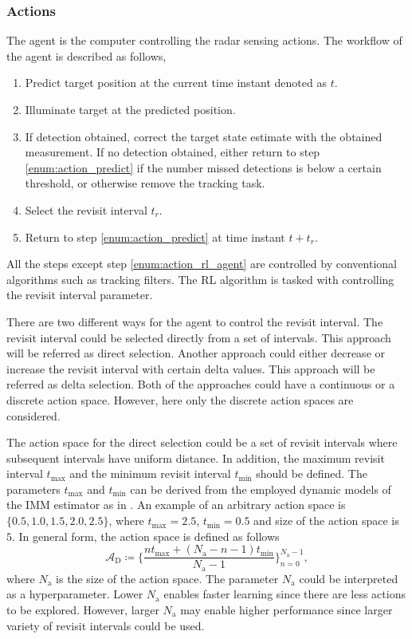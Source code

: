\documentclass[english, 12pt, a4paper, elec, utf8, a-1b, online]{aaltothesis}
\newcommand{\As}{\mathcal{A}}
\newcommand{\tmax}{t_\text{max}}
\newcommand{\tmin}{t_\text{min}}
\newcommand{\Asdir}{\As_\text{D}}
\newcommand{\nacts}{{N_\text{a}}}
\begin{document}
\subsubsection{Actions} \label{sec:actions}

The agent is the computer controlling the radar sensing actions.
The workflow of the agent is described as follows,
\begin{enumerate}
    \item Predict target position at the current time instant denoted as $t$. \label{enum:action_predict}
    \item Illuminate target at the predicted position.
    \item If detection obtained, correct the target state estimate with the obtained measurement. If no detection obtained, either return to step \ref{enum:action_predict} if the number missed detections is below a certain threshold, or otherwise remove the tracking task.
    \item Select the revisit interval $t_r$. \label{enum:action_rl_agent}
    \item Return to step \ref{enum:action_predict} at time instant $t+t_r$.
\end{enumerate}
All the steps except step \ref{enum:action_rl_agent} are controlled by conventional algorithms such as tracking filters.
The RL algorithm is tasked with controlling the revisit interval parameter.

There are two different ways for the agent to control the revisit interval.
The revisit interval could be selected directly from a set of intervals.
This approach will be referred as direct selection.
Another approach could either decrease or increase the revisit interval with certain delta values.
This approach will be referred as delta selection.
Both of the approaches could have a continuous or a discrete action space.
However, here only the discrete action spaces are considered.

The action space for the direct selection could be a set of revisit intervals where subsequent intervals have uniform distance.
In addition, the maximum revisit interval $\tmax$ and the minimum revisit interval $\tmin$ should be defined.
The parameters $\tmax$ and $\tmin$ can be derived from the employed dynamic models of the IMM estimator as in \cite{Benoudnine2006}.
An example of an arbitrary action space is $\{0.5, 1.0, 1.5, 2.0, 2.5\}$, where $\tmax=2.5$, $\tmin=0.5$ and size of the action space is $5$.
In general form, the action space is defined as follows
\begin{equation}\label{eq:as_direct}
    \Asdir \coloneqq \{ \frac{n \tmax + (\nacts-n-1) \tmin}{\nacts-1} \}_{n=0}^{\nacts-1},    
\end{equation}
where $\nacts$ is the size of the action space.
The parameter $\nacts$ could be interpreted as a hyperparameter.
Lower $\nacts$ enables faster learning since there are less actions to be explored.
However, larger $\nacts$ may enable higher performance since larger variety of revisit intervals could be used.
\end{document}
